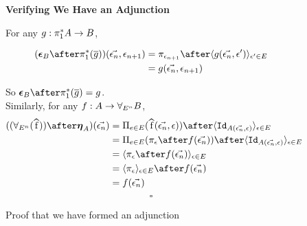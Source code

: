 \documentclass{Report}
\begin{document}
\begin{figure}
    \begin{framed}
        \centering
        \textbf{Verifying We Have an Adjunction}

        \centering
        For any $g: \pi_1^* A \rightarrow B$,
        
        \begin{align*}
            (\counit{B}\after\pstar(\bar{g}))(\env, \e_{n+1}) & = \pi_{\e_{n+1}}\after\finpr{g(\env, \e')}{\e'\in E}\\
            &= g(\env, \e_{n+1})
        \end{align*}
        
        \centering
        So $\counit{B}\after\pstar(\bar{g}) = g$.
\\


        Similarly, for any $f: A \rightarrow \forall_{E^n} B$,
        \begin{align*}
            ((\allEn(\widehat{f}))\after\unit{A})(\env) & = \Pi_{e\in E}(\widehat{f}(\env, \e))\after \finpr{\Id{A(\env, \e)}}{\e\in E}\\
            & = \Pi_{e\in E}(\pi_\e\after f(\env))\after \finpr{\Id{A(\env, \e)}}{\e\in E}\\
            & =  \finpr{\pi_\e\after f(\env)}{\e\in E}\\
            & = \finpr{\pi_\e}{\e\in E}\after f(\env)\\
            & = f(\env)
        \end{align*}
        $$\square$$
    \end{framed}
    \caption{Proof that we have formed an adjunction}
    \label{AdjunctionProof}
\end{figure}
\end{document}
